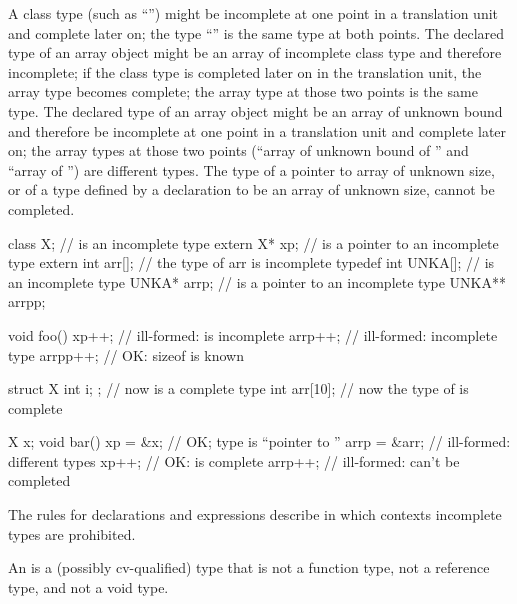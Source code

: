 \pnum
A class type (such as ``'') might be incomplete at one
point in a translation unit and complete later on; the type
``'' is the same type at both points. The declared type
of an array object might be an array of incomplete class type and
therefore incomplete; if the class type is completed later on in the
translation unit, the array type becomes complete; the array type at
those two points is the same type. The declared type of an array object
might be an array of unknown bound and therefore be incomplete at one
point in a translation unit and complete later on; the array types at
those two points (``array of unknown bound of '' and ``array of
 '') are different types. The type of a pointer to array of
unknown size, or of a type defined by a  declaration to
be an array of unknown size, cannot be completed. \enterexample

%
\begin{codeblock}
class X;                        //  is an incomplete type
extern X* xp;                   //  is a pointer to an incomplete type
extern int arr[];               // the type of arr is incomplete
typedef int UNKA[];             //  is an incomplete type
UNKA* arrp;                     //  is a pointer to an incomplete type
UNKA** arrpp;

void foo() {
  xp++;                         // ill-formed:  is incomplete
  arrp++;                       // ill-formed: incomplete type
  arrpp++;                      // OK: sizeof  is known
}

struct X { int i; };            // now  is a complete type
int  arr[10];                   // now the type of  is complete

X x;
void bar() {
  xp = &x;                      // OK; type is ``pointer to ''
  arrp = &arr;                  // ill-formed: different types
  xp++;                         // OK:   is complete
  arrp++;                       // ill-formed:  can't be completed
}
\end{codeblock}
\exitexample 

\pnum
\enternote The rules for declarations and expressions describe in which
contexts incomplete types are prohibited. \exitnote

\pnum
{}%
An  is a (possibly cv-qualified) type that is not
a function type, not a reference type, and not a void type.

